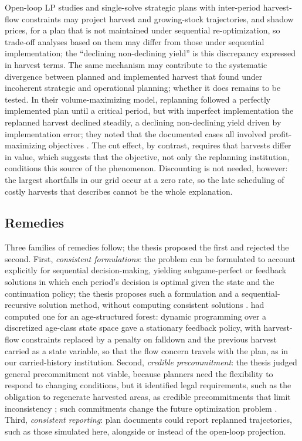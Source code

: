 Open-loop LP studies and single-solve strategic plans with inter-period harvest-flow constraints may project harvest and growing-stock trajectories, and shadow prices, for a plan that is not maintained under sequential re-optimization, so trade-off analyses based on them may differ from those under sequential implementation; the ``declining non-declining yield'' \citep[p.~332]{gunn2007models} is this discrepancy expressed in harvest terms. The same mechanism may contribute to the systematic divergence between planned and implemented harvest that \citet{paradis2013risk} found under incoherent strategic and operational planning; whether it does remains to be tested. In their volume-maximizing model, replanning followed a perfectly implemented plan until a critical period, but with imperfect implementation the replanned harvest declined steadily, a declining non-declining yield driven by implementation error; they noted that the documented cases all involved profit-maximizing objectives \citep{paradis2013risk}. The cut effect, by contrast, requires that harvests differ in value, which suggests that the objective, not only the replanning institution, conditions this source of the phenomenon. Discounting is not needed, however: the largest shortfalls in our grid occur at a zero rate, so the late scheduling of costly harvests that \citet[p.~332]{gunn2007models} describes cannot be the whole explanation.

\hypertarget{remedies}{%
\subsection{Remedies}\label{remedies}}

Three families of remedies follow; the thesis proposed the first and rejected the second. First, \emph{consistent formulations}: the problem can be formulated to account explicitly for sequential decision-making, yielding subgame-perfect or feedback solutions in which each period's decision is optimal given the state and the continuation policy; the thesis proposes such a formulation and a sequential-recursive solution method, without computing consistent solutions \citep[pp.~136--137]{daugherty1991credibility}. \citet{ludwig1993forest} had computed one for an age-structured forest: dynamic programming over a discretized age-class state space gave a stationary feedback policy, with harvest-flow constraints replaced by a penalty on falldown and the previous harvest carried as a state variable, so that the flow concern travels with the plan, as in our carried-history institution. Second, \emph{credible precommitment}: the thesis judged general precommitment not viable, because planners need the flexibility to respond to changing conditions, but it identified legal requirements, such as the obligation to regenerate harvested areas, as credible precommitments that limit inconsistency \citep[p.~133]{daugherty1991credibility}; such commitments change the future optimization problem \citep[cf.][]{bogle2015protecting}. Third, \emph{consistent reporting}: plan documents could report replanned trajectories, such as those simulated here, alongside or instead of the open-loop projection.

